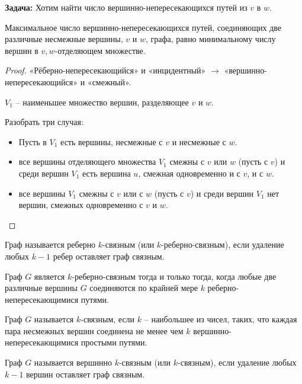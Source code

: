 	\textbf{Задача:} Хотим найти число вершинно-непересекающихся путей из $v$ в $w$.
	
	\begin{Thm}
		Максимальное число вершинно-непересекающихся путей, соединяющих две различные несмежные вершины, $v$ и $w$, графа, равно минимальному числу вершин в $v,w$-отделяющем множестве.
	\end{Thm}

	\begin{proof}
		«Рёберно-непересекающийся» и «инцидентный» $\to$ «вершинно-непересекающийся» и «смежный».
		
		$V_1$ -- наименьшее множество вершин, разделяющее $v$ и $w$.

		Разобрать три случая:

		\begin{itemize}
			\item Пусть в $V_1$ есть вершины, несмежные с $v$ и несмежные с $w$.
			\item все вершины отделяющего множества $V_1$ смежны с $v$ или $w$ (пусть с $v$) и среди вершин $V_1$ есть вершина $u$, смежная одновременно и с $v$, и с $w$.
			\item все вершины $V_1$ смежны с $v$ или с $w$ (пусть с $v$) и среди вершин $V_1$ нет вершин, смежных одновременно с $v$ и $w$.
		\end{itemize}
	\end{proof}

	\begin{Def}
		Граф называется реберно $k$-связным (или $k$-реберно-связным), если удаление любых $k-1$ ребер оставляет граф связным.
	\end{Def}

	\begin{Cons}
		Граф $G$ является $k$-реберно-связным тогда и только тогда, когда любые две различные вершины $G$ соединяются по крайней мере $k$ реберно-непересекающимися путями.
	\end{Cons}

	\begin{Def}
		Граф $G$ называется $k$-связным, если $k$ -- наибольшее из чисел, таких, что каждая пара несмежных вершин соединена не менее чем $k$ вершинно-непересекающимися простыми путями.
	\end{Def}

	\begin{Def}[Альтернативное]
		Граф $G$ называется вершинно $k$-связным (или $k$-связным), если удаление любых $k-1$ вершин оставляет граф связным.
	\end{Def}

